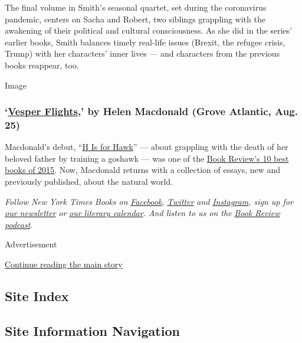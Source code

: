 The final volume in Smith's seasonal quartet, set during the coronavirus
pandemic, centers on Sacha and Robert, two siblings grappling with the
awakening of their political and cultural consciousness. As she did in
the series' earlier books, Smith balances timely real-life issues
(Brexit, the refugee crisis, Trump) with her characters' inner lives ---
and characters from the previous books reappear, too.

Image

\hypertarget{vesper-flights-by-helen-macdonald-grove-atlantic-aug-25}{%
\subsubsection{\texorpdfstring{`\href{https://groveatlantic.com/book/vesper-flights/}{Vesper
Flights},' by Helen Macdonald (Grove Atlantic, Aug.
25)}{`Vesper Flights,' by Helen Macdonald (Grove Atlantic, Aug. 25)}}\label{vesper-flights-by-helen-macdonald-grove-atlantic-aug-25}}

Macdonald's debut,
``\href{https://www.nytimes.com/2015/02/22/books/review/helen-macdonalds-h-is-for-hawk.html}{H
Is for Hawk}'' --- about grappling with the death of her beloved father
by training a goshawk --- was one of the
\href{https://www.nytimes.com/interactive/2015/12/02/books/review/best-books-of-2015.html}{Book
Review's 10 best books of 2015}. Now, Macdonald returns with a
collection of essays, new and previously published, about the natural
world.

\emph{Follow New York Times Books on}
\href{https://www.facebook.com/nytbooks/}{\emph{Facebook}}\emph{,}
\href{https://twitter.com/nytimesbooks}{\emph{Twitter}} \emph{and}
\href{https://www.instagram.com/nytbooks/}{\emph{Instagram}}\emph{, sign
up for}
\href{https://www.nytimes.com/newsletters/books-review}{\emph{our
newsletter}} \emph{or}
\href{https://www.nytimes.com/interactive/2017/books/books-calendar.html}{\emph{our
literary calendar}}\emph{. And listen to us on the}
\href{https://www.nytimes.com/column/book-review-podcast}{\emph{Book
Review podcast}}\emph{.}

Advertisement

\protect\hyperlink{after-bottom}{Continue reading the main story}

\hypertarget{site-index}{%
\subsection{Site Index}\label{site-index}}

\hypertarget{site-information-navigation}{%
\subsection{Site Information
Navigation}\label{site-information-navigation}}

